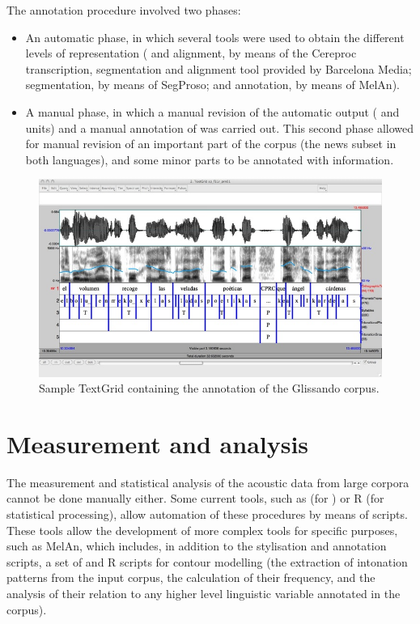 \documentclass[output=paper]{langsci/langscibook}
\begin{document}
The annotation procedure involved two phases: 

\begin{itemize}
\item
An automatic phase, in which several tools were used to obtain the different levels of representation ( and alignment, by means of the Cereproc transcription, segmentation and alignment tool provided by Barcelona Media;  segmentation, by means of SegProso; and  annotation, by means of MelAn).

\item
A manual phase, in which a manual revision of the automatic output ( and  units) and a manual annotation of  was carried out. This second phase allowed for manual revision of an important part of the corpus (the news subset in both languages), and some minor parts to be annotated with  information. 
\end{itemize}

\begin{figure}
\includegraphics[width=\textwidth]{figures/GAR-img007.png}
\caption{Sample TextGrid containing the annotation of the Glissando corpus.}
\label{fig:gar:7}
\end{figure}

\section{Measurement and analysis}

The measurement and statistical analysis of the acoustic data from large corpora cannot be done manually either. Some current tools, such as  (for ) or R (for statistical processing), allow automation of these procedures by means of scripts. These tools allow the development of more complex tools for specific purposes, such as MelAn, which includes, in addition to the stylisation and annotation scripts, a set of  and R scripts for contour modelling (the extraction of intonation patterns from the input corpus, the calculation of their frequency, and the analysis of their relation to any higher level linguistic variable annotated in the corpus).
\end{document}

